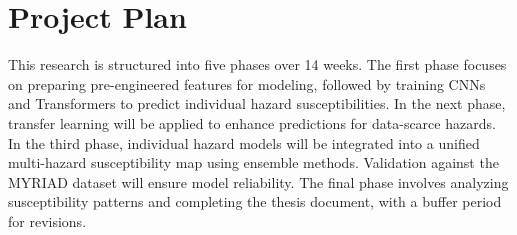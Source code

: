 \section{Project Plan}
\label{sec:project_plan}

This research is structured into five phases over 14 weeks. The first phase focuses on preparing pre-engineered features for modeling, followed by training CNNs and Transformers to predict individual hazard susceptibilities. In the next phase, transfer learning will be applied to enhance predictions for data-scarce hazards. In the third phase, individual hazard models will be integrated into a unified multi-hazard susceptibility map using ensemble methods. Validation against the MYRIAD dataset will ensure model reliability. The final phase involves analyzing susceptibility patterns and completing the thesis document, with a buffer period for revisions.


\begin{center}
    \begin{chronology}[1]{0}{13}{60ex}[\linewidth]
    \end{chronology}
\end{center}
\newpage

